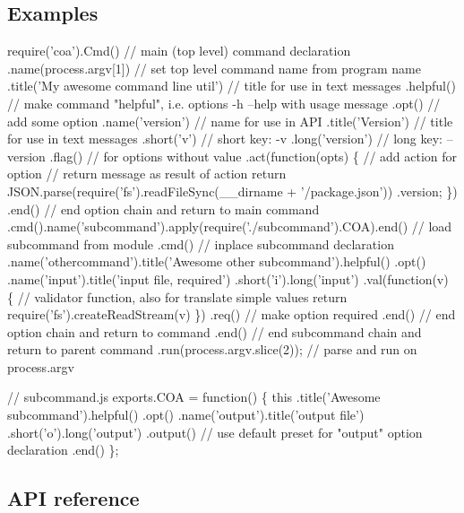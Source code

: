 \subsection*{Examples}


\begin{DoxyCode}
require('coa').Cmd() // main (top level) command declaration
    .name(process.argv[1]) // set top level command name from program name
    .title('My awesome command line util') // title for use in text messages
    .helpful() // make command "helpful", i.e. options -h --help with usage message
    .opt() // add some option
        .name('version') // name for use in API
        .title('Version') // title for use in text messages
        .short('v') // short key: -v
        .long('version') // long key: --version
        .flag() // for options without value
        .act(function(opts) \{ // add action for option
            // return message as result of action
            return JSON.parse(require('fs').readFileSync(\_\_dirname + '/package.json'))
                .version;
        \})
        .end() // end option chain and return to main command
    .cmd().name('subcommand').apply(require('./subcommand').COA).end() // load subcommand from module
    .cmd() // inplace subcommand declaration
        .name('othercommand').title('Awesome other subcommand').helpful()
        .opt()
            .name('input').title('input file, required')
            .short('i').long('input')
            .val(function(v) \{ // validator function, also for translate simple values
                return require('fs').createReadStream(v) \})
            .req() // make option required
            .end() // end option chain and return to command
        .end() // end subcommand chain and return to parent command
    .run(process.argv.slice(2)); // parse and run on process.argv
\end{DoxyCode}



\begin{DoxyCode}
// subcommand.js
exports.COA = function() \{
    this
        .title('Awesome subcommand').helpful()
        .opt()
            .name('output').title('output file')
            .short('o').long('output')
            .output() // use default preset for "output" option declaration
            .end()
\};
\end{DoxyCode}


\subsection*{A\+PI reference}

